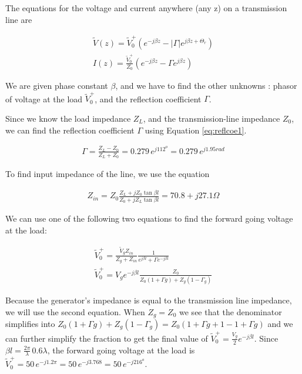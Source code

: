 \documentclass{ximera}
\begin{document}
\begin{example}
\begin{explanation}

The equations for the voltage and current anywhere (any z) on a transmission line  are


\begin{eqnarray}
\tilde{V}(z)= \tilde{V}_0^+ (e^{-j \beta z} - |\Gamma|  e^{j \beta z + \Theta_r}  ) \label{eq:vtlfin} \\
I(z)=   \frac{\tilde{V}_0^+}{Z_0}  (e^{-j \beta z} - \Gamma  e^{j \beta z}  ) \label{eq:itlfin}
\end{eqnarray}

We are given phase constant $\beta$, and we have to find the other unknowns : phasor of voltage at the load $\tilde{V}_0^+$, and the reflection coefficient $\Gamma$.    

Since we know the load impedance $Z_L$, and the transmission-line impedance $Z_0$, we can find the reflection coefficient $\Gamma$ using Equation \ref{eq:reflcoe1}.

\begin{eqnarray}
\Gamma =  \frac{Z_L -Z_0}{Z_L +Z_0}=0.279 \, e^{j112^o}=0.279 \, e^{j1.95 \unit{rad}} \label{eq:reflcoe1}
\end{eqnarray}

To find input impedance of the line, we use the equation 


\begin{eqnarray}
Z_{in}= Z_0 \frac{Z_L+ j Z_0 \tan \beta l}{Z_0+ j Z_L \tan \beta l} = 70.8+ j 27.1 \Omega
\end{eqnarray}

We can use one of the following two equations to find the forward going voltage at the load:

\begin{eqnarray}
\tilde{V}_0^+= \frac{\tilde{V}_g Z_{in}}{Z_g + Z_{in}} \frac{1}{e^{j \beta l} + \Gamma e^{-j \beta l}} \\
\tilde{V}_0^+=V_g e^{-j \beta l} \frac{Z_0}{Z_0 (1+\Gamma{g}) +Z_g (1-\Gamma_{g})}
\end{eqnarray}

Because the generator's impedance is equal to the transmission line impedance, we will use the second equation. When $Z_g=Z_0$ we see that the denominator simplifies into $Z_0 (1+\Gamma{g}) +Z_g (1-\Gamma_{g}) = Z_0 (1+\Gamma{g}+1-1+\Gamma{g})$ and we can further simplify the fraction to get the final value of $\tilde{V}_0^+=\frac{V_g}{2} e^{-j \beta l}$. Since $\beta l = \frac{2 \pi}{\lambda} \, 0.6 \lambda$, the forward going voltage at the load is $\tilde{V}_0^+=50 \, e^{-j1.2 \pi} = 50 \, e^{-j3.768} =50 \, e^{-j216^o} $.




\end{explanation}
\end{example}
\end{document}
